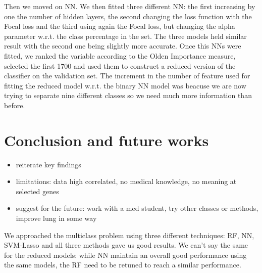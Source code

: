 \documentclass[a4paper,11pt, oneside]{article}  %
\begin{document}
	Then we moved on NN. We then fitted three different NN: the first increasing by one the number of hidden layers, the second changing the loss function with the Focal loss and the third using again the Focal loss, but changing the alpha parameter w.r.t. the class percentage in the set.
	The three models held similar result with the second one being slightly more accurate. Once this NNs were fitted, we ranked the variable according to the Olden Importance measure, selected the first 1700 and used them to construct a reduced version of the classifier on the validation set.
	The increment in the number of feature used for fitting the reduced model w.r.t. the binary NN model was beacuse we are now trying to separate nine different classes so we need much more information than before.
	
	
	\section{Conclusion and future works}
	\begin{itemize}
		\item reiterate key findings
		\item limitations: data high correlated,  no medical knowledge,  no meaning at selected genes
		\item suggest for the future: work with a med student,  try other classes or methods,  improve lung in some way
	\end{itemize}
	
	We approached the multiclass problem using three different techniques: RF, NN, SVM-Lasso and all three methods gave us good results. We can't say the same for the reduced models: while NN maintain an overall good performance using the same models, the RF need to be retuned to reach a similar performance. 
	
	
\end{document}
